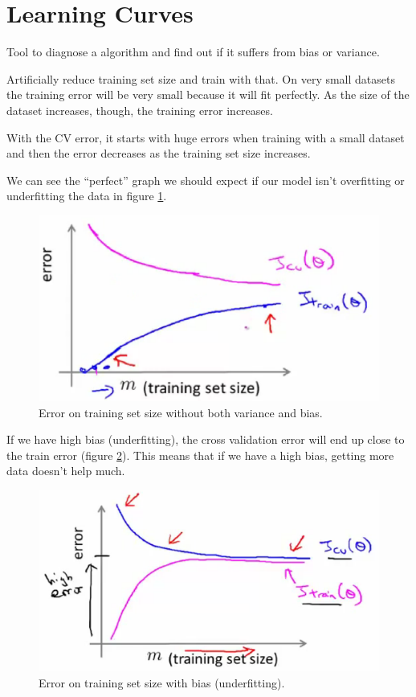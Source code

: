 \documentclass[10pt]{extarticle}
\begin{document}
\section{Learning Curves}\label{learning-curves}

Tool to diagnose a algorithm and find out if it suffers from bias or
variance.

Artificially reduce training set size and train with that. On very small
datasets the training error will be very small because it will fit
perfectly. As the size of the dataset increases, though, the training
error increases.

With the CV error, it starts with huge errors when training with a small
dataset and then the error decreases as the training set size increases.

We can see the ``perfect'' graph we should expect if our model isn't
overfitting or underfitting the data in figure
\ref{fig:error_training_size_perfect}.

\begin{figure}
\centering
\includegraphics[width=\textwidth]{img/error_training_size_perfect.eps}
\caption{Error on training set size without both variance and bias.}
\label{fig:error_training_size_perfect}
\end{figure}

If we have high bias (underfitting), the cross validation error will end
up close to the train error (figure \ref{fig:error_training_size_bias}).
This means that if we have a high bias, getting more data doesn't help
much.

\begin{figure}
\centering
\includegraphics[width=\textwidth]{img/error_training_size_bias.eps}
\caption{Error on training set size with bias (underfitting).}
\label{fig:error_training_size_bias}
\end{figure}
\end{document}
